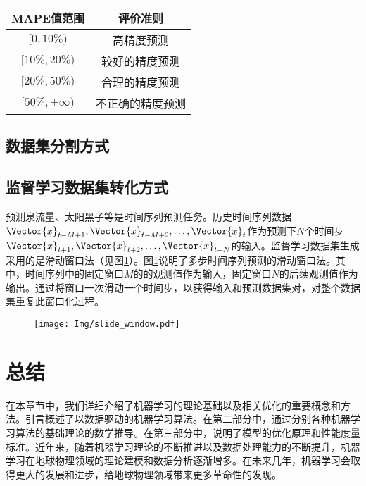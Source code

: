 \begin{table}[!htbp]
    \label{tab:MAPE_Criteria}
    \centering
    \footnotesize
    \setlength{\tabcolsep}{4pt}
    \renewcommand{\arraystretch}{1.2}%
    \begin{tabular}{cc}
        \hline
        MAPE值范围 & 评价准则\\
        \hline
        $[0,10\%)$ & 高精度预测  \\
        $[10\%,20\%)$ & 较好的精度预测  \\
        $[20\%,50\%)$ & 合理的精度预测  \\
        $[50\%,+\infty)$ & 不正确的精度预测  \\
        \hline
    \end{tabular}
\end{table}


\subsection{数据集分割方式}

\subsection{监督学习数据集转化方式}
预测泉流量、太阳黑子等是时间序列预测任务。历史时间序列数据$\Vector{x}_{t-M+1},\Vector{x}_{t-M+2},\ldots,\Vector{x}_{t}$作为预测下$N$个时间步$\Vector{x}_{t+1},\Vector{x}_{t+2},\ldots,\Vector{x}_{t+N}$的输入。监督学习数据集生成采用的是滑动窗口法（见图\ref{fig:slide_window}）。图\ref{fig:slide_window}说明了多步时间序列预测的滑动窗口法。其中，时间序列中的固定窗口$M$的的观测值作为输入，固定窗口$N$的后续观测值作为输出。通过将窗口一次滑动一个时间步，以获得输入和预测数据集对，对整个数据集重复此窗口化过程。

\begin{figure}[!htbp]
    \centering
    \texttt{[image: Img/slide\_window.pdf]}
    \label{fig:slide_window}
\end{figure}

\section{总结}\label{sec:ann_总结}

在本章节中，我们详细介绍了机器学习的理论基础以及相关优化的重要概念和方法。引言概述了以数据驱动的机器学习算法。在第二部分中，通过分别各种机器学习算法的基础理论的数学推导。在第三部分中，说明了模型的优化原理和性能度量标准。近年来，随着机器学习理论的不断推进以及数据处理能力的不断提升，机器学习在地球物理领域的理论建模和数据分析逐渐增多。在未来几年，机器学习会取得更大的发展和进步，给地球物理领域带来更多革命性的发现。
